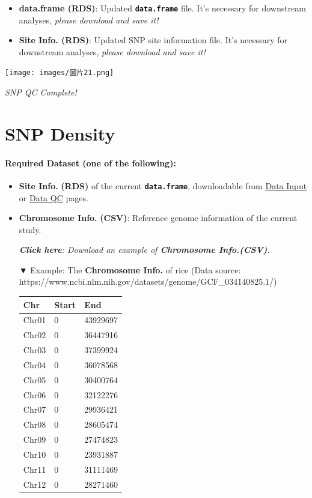 \documentclass[
]{book}
\begin{document}
\begin{itemize}
\item
  \textbf{data.frame (RDS)}: Updated {\textbf{\texttt{data.frame}}} file. It's necessary for downstream analyses, \emph{please download and save it!}
\item
  \textbf{Site Info. (RDS)}: Updated SNP site information file. It's necessary for downstream analyses, \emph{please download and save it!}
\end{itemize}

\texttt{[image: images/圖片21.png]}

\emph{SNP QC Complete!}

\section{SNP Density}\label{snp-density}

\paragraph*{Required Dataset (one of the following):}\label{required-dataset-one-of-the-following-3}

\begin{itemize}
\item
  \textbf{Site Info.} \textbf{(RDS)} of the current \textbf{\texttt{data.frame}}, downloadable from \ul{Data Input} or \ul{Data QC} pages.
\item
  \textbf{Chromosome Info.} \textbf{(CSV)}: Reference genome information of the current study.

  \textbf{\emph{Click here}}\emph{: Download an example of \textbf{Chromosome Info.(CSV)}.}

  ▼ Example: The \textbf{Chromosome Info.} of rice (Data source: https://www.ncbi.nlm.nih.gov/datasets/genome/GCF\_034140825.1/)

  \begin{longtable}[]{@{}lll@{}}
  \toprule\noalign{}
  Chr & Start & End \\
  \midrule\noalign{}
  \endhead
  \bottomrule\noalign{}
  \endlastfoot
  Chr01 & 0 & 43929697 \\
  Chr02 & 0 & 36447916 \\
  Chr03 & 0 & 37399924 \\
  Chr04 & 0 & 36078568 \\
  Chr05 & 0 & 30400764 \\
  Chr06 & 0 & 32122276 \\
  Chr07 & 0 & 29936421 \\
  Chr08 & 0 & 28605474 \\
  Chr09 & 0 & 27474823 \\
  Chr10 & 0 & 23931887 \\
  Chr11 & 0 & 31111469 \\
  Chr12 & 0 & 28271460 \\
  \end{longtable}
\end{itemize}
\end{document}
